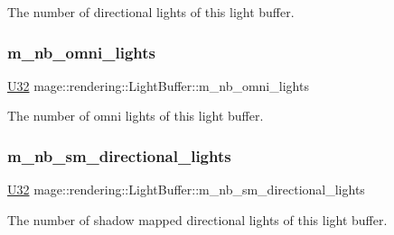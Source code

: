 The number of directional lights of this light buffer. \hypertarget{structmage_1_1rendering_1_1_light_buffer_a1a5e40bcec229bad29eacde98f3abe28}{}\label{structmage_1_1rendering_1_1_light_buffer_a1a5e40bcec229bad29eacde98f3abe28} 
\subsubsection{\texorpdfstring{m\+\_\+nb\+\_\+omni\+\_\+lights}{m\_nb\_omni\_lights}}
{\footnotesize\ttfamily \hyperlink{namespacemage_a41c104c036fba3756a74e19f793eeaa1}{U32} mage\+::rendering\+::\+Light\+Buffer\+::m\+\_\+nb\+\_\+omni\+\_\+lights}

The number of omni lights of this light buffer. \hypertarget{structmage_1_1rendering_1_1_light_buffer_ad90bc8cb163fe39efcb5c960cb566f16}{}\label{structmage_1_1rendering_1_1_light_buffer_ad90bc8cb163fe39efcb5c960cb566f16} 
\subsubsection{\texorpdfstring{m\+\_\+nb\+\_\+sm\+\_\+directional\+\_\+lights}{m\_nb\_sm\_directional\_lights}}
{\footnotesize\ttfamily \hyperlink{namespacemage_a41c104c036fba3756a74e19f793eeaa1}{U32} mage\+::rendering\+::\+Light\+Buffer\+::m\+\_\+nb\+\_\+sm\+\_\+directional\+\_\+lights}

The number of shadow mapped directional lights of this light buffer. \hypertarget{structmage_1_1rendering_1_1_light_buffer_a1a40cf5d4100b48837cae57ac2f36fcf}{}\label{structmage_1_1rendering_1_1_light_buffer_a1a40cf5d4100b48837cae57ac2f36fcf} 
